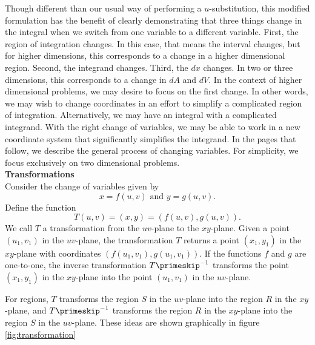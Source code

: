 Though different than our usual way of performing a $u$-substitution, this modified formulation has the benefit of clearly demonstrating that three things change in the integral when we switch from one variable to a different variable.  First, the region of integration changes.  In this case, that means the interval changes, but for higher dimensions, this corresponds to a change in a higher dimensional region.  Second, the integrand changes.  Third, the $dx$ changes.  In two or three dimensions, this corresponds to a change in $dA$ and $dV.$ In the context of higher dimensional problems, we may desire to focus on the first change.  In other words, we may wish to change coordinates in an effort to simplify a complicated region of integration.  Alternatively, we may have an integral with a complicated integrand.  With the right change of variables, we may be able to work in a new coordinate system that significantly simplifies the integrand.  In the pages that follow, we describe the general process of changing variables.  For simplicity, we focus exclusively on two dimensional problems.\\

\noindent\textbf{\large Transformations}\\

Consider the change of variables given by
\[
	x = f(u,v) \text{ and } y = g(u,v).
\]
Define the function
\[
	T(u,v) = (x,y) = (f(u,v),g(u,v)).
\]
We call $T$ a transformation from the $uv$-plane to the $xy$-plane.  Given a point $(u_1,v_1)$ in the $uv$-plane, the transformation $T$ returns a point $(x_1,y_1)$ in the $xy$-plane with coordinates $(f(u_1,v_1),g(u_1,v_1)).$  If the functions $f$ and $g$ are one-to-one, the inverse transformation $T\primeskip^{-1}$ transforms the point $(x_1,y_1)$ in the $xy$-plane into the point $(u_1,v_1)$ in the $uv$-plane.

For regions, $T$ transforms the region $S$ in the $uv$-plane into the region $R$ in the $xy$-plane, and $T\primeskip^{-1}$ transforms the region $R$ in the $xy$-plane into the region $S$ in the $uv$-plane.  These ideas are shown graphically in figure \ref{fig:transformation}


